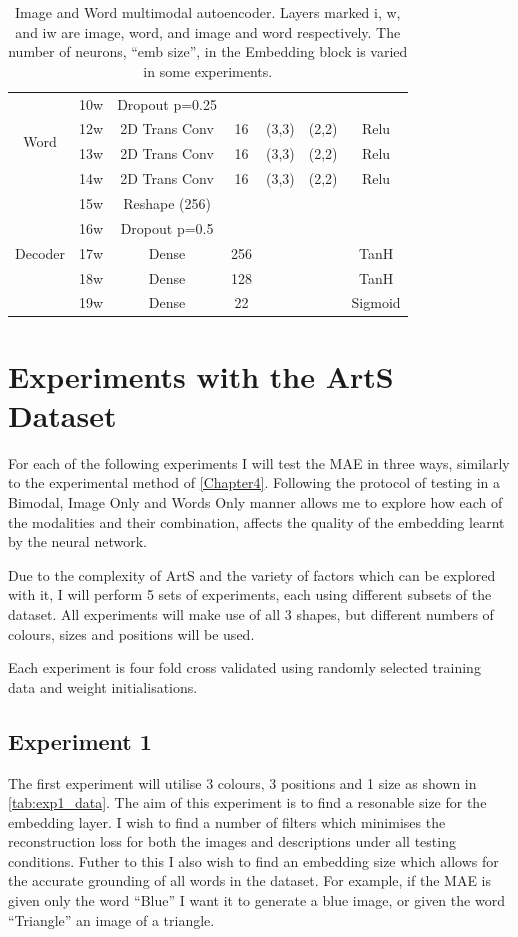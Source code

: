 \begin{table}
\begin{tabular}{|c|c|c|c|c|c|c|}
			\multirow{4}{*}{Word} & 10w 	&	Dropout p=0.25 &	 & 	     &       & \\ \cline{2-7}
			& 12w	&	2D Trans Conv & 16 & (3,3) & (2,2)  & Relu \\ \cline{2-7}
			& 13w	&	2D Trans Conv & 16 & (3,3) & (2,2)  & Relu \\ \cline{2-7}
			& 14w	&	2D Trans Conv & 16 & (3,3) & (2,2)  & Relu \\ \cline{2-7}
\multirow{5}{*}{Decoder}& 15w	& Reshape (256) & & & & \\ \cline{2-7}
			& 16w	& Dropout p=0.5 &	 & 	     &       & \\ \cline{2-7}
			& 17w	& Dense & 256 & & &TanH \\ \cline{2-7}
			& 18w	& Dense & 128 & & &TanH \\ \cline{2-7}
			& 19w	& Dense & 22 & & & Sigmoid \\ \hline
			
			
		\end{tabular}
		\caption{Image and Word multimodal autoencoder. Layers marked i, w, and iw are image, word, and image and word respectively. The number of neurons, ``emb size'', in the Embedding block is varied in some experiments.}
		\label{tab:Arts_MAE_description}

	\end{table}

\section{Experiments with the ArtS Dataset}
For each of the following experiments I will test the MAE in three ways, similarly to the experimental method of \autoref{Chapter4}. Following the protocol of testing in a Bimodal, Image Only and Words Only manner allows me to explore how each of the modalities and their combination, affects the quality of the embedding learnt by the neural network.


Due to the complexity of ArtS and the variety of factors which can be explored with it, I will perform 5 sets of experiments, each using different subsets of the dataset. All experiments will make use of all 3 shapes, but different numbers of colours, sizes and positions will be used.

Each experiment is four fold cross validated using randomly selected training data and weight initialisations.

\subsection{Experiment 1}
The first experiment will utilise 3 colours, 3 positions and 1 size as shown in \autoref{tab:exp1_data}. The aim of this experiment is to find a resonable size for the embedding layer. I wish to find a number of filters which minimises the reconstruction loss for both the images and descriptions under all testing conditions. Futher to this I also wish to find an embedding size which allows for the accurate grounding of all words in the dataset. For example, if the MAE is given only the word ``Blue'' I want it to generate a blue image, or given the word ``Triangle'' an image of a triangle. 


